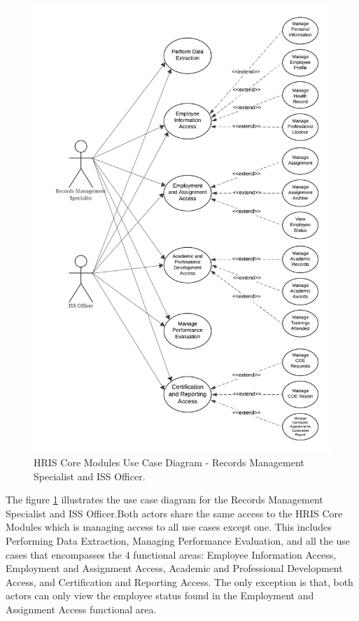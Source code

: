     \begin{figure}[H]
        \centering
        \includegraphics[width=0.9\linewidth]{figures/images/diagrams/usecase/use-case-basic-4.png}
        \caption{HRIS Core Modules Use Case Diagram - Records Management Specialist and ISS Officer.}
        \label{fig:use-case-basic-4}
    \end{figure}

    The figure \ref{fig:use-case-basic-4} illustrates the use case diagram for the Records Management Specialist and ISS Officer.Both actors share the same access to the HRIS Core Modules which is managing access to all use cases except one. This includes Performing Data Extraction, Managing Performance Evaluation, and all the use cases that encompasses the 4 functional areas: Employee Information Access, Employment and Assignment Access, Academic and Professional Development Access, and Certification and Reporting Access. The only exception is that, both actors can only view the employee status found in the Employment and Assignment Access functional area.

